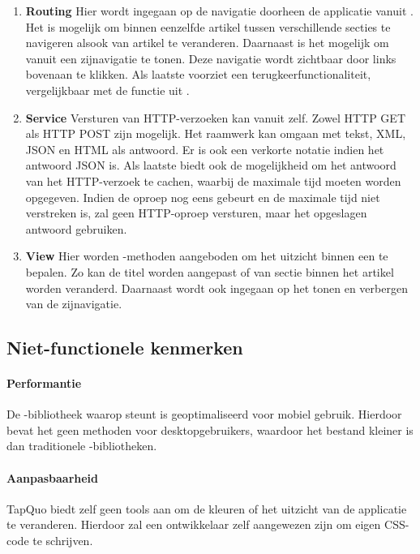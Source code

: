 \begin{enumerate}
\item \textbf{Routing }
Hier wordt ingegaan op de navigatie doorheen de applicatie vanuit \js{}.
Het is mogelijk om binnen eenzelfde artikel tussen verschillende secties te navigeren alsook van artikel te veranderen.
Daarnaast is het mogelijk om vanuit \js{} een zijnavigatie te tonen.
Deze navigatie wordt zichtbaar door links bovenaan te klikken.
Als laatste voorziet \lungo{} een terugkeerfunctionaliteit, vergelijkbaar met de functie  uit \js{}.

\item \textbf{Service }
Versturen van HTTP-verzoeken kan vanuit \lungo{} zelf.
Zowel HTTP GET als HTTP POST zijn mogelijk.
Het raamwerk kan omgaan met tekst, XML, JSON en HTML als antwoord.
Er is ook een verkorte notatie indien het antwoord JSON is.
Als laatste biedt \lungo{} ook de mogelijkheid om het antwoord van het HTTP-verzoek te cachen, waarbij de maximale tijd moeten worden opgegeven.
Indien de oproep nog eens gebeurt en de maximale tijd niet verstreken is, zal \lungo{} geen HTTP-oproep versturen, maar het opgeslagen antwoord gebruiken.

\item \textbf{View }
Hier worden \js{}-methoden aangeboden om het uitzicht binnen een  te bepalen.
Zo kan de titel worden aangepast of van sectie binnen het artikel worden veranderd.
Daarnaast wordt ook ingegaan op het tonen en verbergen van de zijnavigatie.
 
\end{enumerate}

\subsection{Niet-functionele kenmerken}
\paragraph{Performantie}
De \js{}-bibliotheek waarop \lungo{} steunt is geoptimaliseerd voor mobiel gebruik.
Hierdoor bevat het geen methoden voor desktopgebruikers, waardoor het bestand kleiner is dan traditionele \js{}-bibliotheken.

\paragraph{Aanpasbaarheid}
\label{sec:lungo-aanpasbaarheid}
TapQuo biedt zelf geen tools aan om de kleuren of het uitzicht van de applicatie te veranderen.
Hierdoor zal een ontwikkelaar zelf aangewezen zijn om eigen CSS-code te schrijven.

